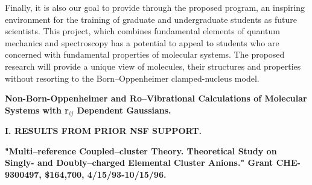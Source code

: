 Finally, it is also our goal to
provide through the proposed program, an inspiring environment 
for the training of graduate and undergraduate students as
future scientists. This project, which combines fundamental elements of 
quantum mechanics and spectroscopy has a potential to appeal
to students who are 
concerned with 
fundamental properties of molecular systems.
The proposed research will provide a unique view of molecules,
their structures and properties without resorting to
the Born--Oppenheimer clamped-nucleus model.


\newpage



\setcounter{page}{1}

\begin{center}
{\Large \bf 
Non-Born-Oppenheimer and Ro--Vibrational Calculations of
Molecular Systems with r$_{ij}$ Dependent Gaussians.}

\end{center}


\vspace{2mm}

\noindent
{\bf I. RESULTS FROM PRIOR NSF SUPPORT.}


\noindent
{\bf "Multi--reference Coupled--cluster Theory. 
Theoretical Study on Singly- and Doubly--charged Elemental 
Cluster Anions."  Grant CHE-9300497,  \$164,700, 4/15/93-10/15/96.}


\vspace{3mm}

